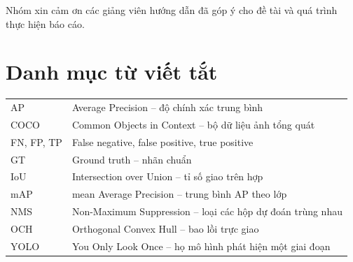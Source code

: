 \documentclass[10pt,a4paper,oneside]{book}
\begin{document}
\frontmatter

\begin{acknowledgments}
Nhóm xin cảm ơn các giảng viên hướng dẫn đã góp ý cho đề tài và quá trình thực hiện báo cáo.
\end{acknowledgments}

\begin{abstract}
Báo cáo trình bày quy trình nhận dạng và phân đoạn bốn lớp phương tiện giao thông bằng YOLO11-seg, rồi biểu diễn vùng xe bằng bao lồi trực giao dựng từ mặt nạ của YOLO. Hai mô hình YOLO11-n và YOLO11-l huấn luyện sẵn được dùng nguyên trạng trong các thí nghiệm và được so sánh sơ bộ trên 100 ảnh giao thông Việt Nam có nhãn polygon. YOLO11-l cho mặt nạ tốt hơn, rõ nhất ở xe máy, nên được chọn cho các thí nghiệm về bao.

Khi dựng từ mặt nạ nhãn, bao lồi trực giao khớp với hình dạng xe tốt hơn bao lồi thông thường và hình chữ nhật bao. Khi dựng từ mặt nạ dự đoán, bao vẫn sát nhãn hơn hai cách biểu diễn này nhưng thấp hơn chính mặt nạ YOLO, vì bao được dựng từ mặt nạ và lấp thêm các phần lõm. Đổi lại, bao luôn là một vùng liền khối, không lỗ.

Đồ án sử dụng hai bản cài đặt dựng bao: bản QuickHull và bản Graham. Hai bản cho cùng vùng bao trên dữ liệu đã kiểm tra, và bản Graham nhanh hơn trên đường biên xe thật. Đây là so sánh giữa hai bản cài đặt của nhóm, chưa phải so sánh với O-Quickhull gốc. Phần dùng đặc trưng bao lồi để sửa lỗi phân loại chưa được đánh giá và thuộc hướng phát triển.
\end{abstract}

\tableofcontents
\listoftables
\listoffigures
{\renewcommand{\addvspace}[1]{}\listofalgorithms}

\chapter*{Danh mục từ viết tắt}
\begin{tabular}{@{}p{3cm}p{11.5cm}@{}}
AP & Average Precision -- độ chính xác trung bình \\
COCO & Common Objects in Context -- bộ dữ liệu ảnh tổng quát \\
FN, FP, TP & False negative, false positive, true positive \\
GT & Ground truth -- nhãn chuẩn \\
IoU & Intersection over Union -- tỉ số giao trên hợp \\
mAP & mean Average Precision -- trung bình AP theo lớp \\
NMS & Non-Maximum Suppression -- loại các hộp dự đoán trùng nhau \\
OCH & Orthogonal Convex Hull -- bao lồi trực giao \\
YOLO & You Only Look Once -- họ mô hình phát hiện một giai đoạn \\
\end{tabular}
\end{document}
